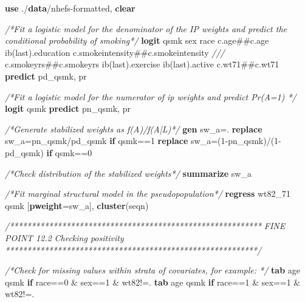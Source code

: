 \documentclass[
  10pt,
]{book}
\newenvironment{Shaded}{\begin{snugshade}}{\end{snugshade}}
\newcommand{\CommentTok}[1]{\textcolor[rgb]{0.56,0.35,0.01}{\textit{#1}}}
\newcommand{\FunctionTok}[1]{\textcolor[rgb]{0.00,0.00,0.00}{#1}}
\newcommand{\KeywordTok}[1]{\textcolor[rgb]{0.13,0.29,0.53}{\textbf{#1}}}
\newcommand{\NormalTok}[1]{#1}
\begin{document}
\begin{Shaded}
\begin{Highlighting}[]
\KeywordTok{use}\NormalTok{ ./}\KeywordTok{data}\NormalTok{/nhefs-formatted, }\KeywordTok{clear}

\CommentTok{/*Fit a logistic model for the denominator of the IP weights and predict the conditional probability of smoking*/} 
\KeywordTok{logit}\NormalTok{ qsmk sex race c.age##c.age ib(}\FunctionTok{last}\NormalTok{).education c.smokeintensity##c.smokeintensity }\CommentTok{///}
\NormalTok{c.smokeyrs##c.smokeyrs ib(}\FunctionTok{last}\NormalTok{).exercise ib(}\FunctionTok{last}\NormalTok{).active c.wt71##c.wt71  }
\KeywordTok{predict}\NormalTok{ pd_qsmk, pr}

\CommentTok{/*Fit a logistic model for the numerator of ip weights and predict Pr(A=1) */} 
\KeywordTok{logit}\NormalTok{ qsmk }
\KeywordTok{predict}\NormalTok{ pn_qsmk, pr}

\CommentTok{/*Generate stabilized weights as f(A)/f(A|L)*/}
\KeywordTok{gen}\NormalTok{ sw_a=.}
\KeywordTok{replace}\NormalTok{ sw_a=pn_qsmk/pd_qsmk }\KeywordTok{if}\NormalTok{ qsmk==1}
\KeywordTok{replace}\NormalTok{ sw_a=(1-pn_qsmk)/(1-pd_qsmk) }\KeywordTok{if}\NormalTok{ qsmk==0}

\CommentTok{/*Check distribution of the stabilized weights*/}
\KeywordTok{summarize}\NormalTok{ sw_a}

\CommentTok{/*Fit marginal structural model in the pseudopopulation*/}
\KeywordTok{regress}\NormalTok{ wt82_71 qsmk [}\KeywordTok{pweight}\NormalTok{=sw_a], }\KeywordTok{cluster}\NormalTok{(seqn) }

\CommentTok{/**********************************************************}
\CommentTok{FINE POINT 12.2}
\CommentTok{Checking positivity}
\CommentTok{**********************************************************/}

\CommentTok{/*Check for missing values within strata of covariates, for example: */}
\KeywordTok{tab}\NormalTok{ age qsmk }\KeywordTok{if}\NormalTok{ race==0 & sex==1 & wt82!=.}
\KeywordTok{tab}\NormalTok{ age qsmk }\KeywordTok{if}\NormalTok{ race==1 & sex==1 & wt82!=.}
\end{Highlighting}
\end{Shaded}
\end{document}
